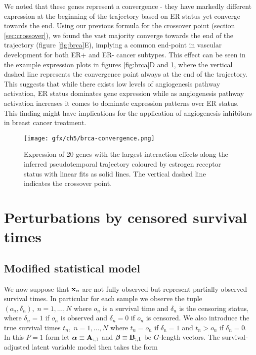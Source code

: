 We noted that these genes represent a convergence - they have markedly different expression at the beginning of the trajectory based on ER status yet converge towards the end. Using our previous formula for the crossover point (section \ref{sec:crossover}), we found the vast majority converge towards the end of the trajectory (figure \ref{fig:brca}E), implying a common end-point in vascular development for both ER+ and ER- cancer subtypes.
This effect can be seen in the example expression plots in figures \ref{fig:brca}D and \ref{fig:brca_convergence}, where the vertical dashed line represents the convergence point always at the end of the trajectory.
This suggests that while there exists low levels of angiogenesis pathway activation, ER status dominates gene expression while as angiogenesis pathway activation increases it comes to dominate expression patterns over ER status. This finding might have implications for the application of angiogenesis inhibitors in breast cancer treatment.

\begin{figure}
   \texttt{[image: gfx/ch5/brca-convergence.png]}
   \caption{Expression of 20 genes with the largest interaction effects along the inferred pseudotemporal trajectory coloured by estrogen receptor status with linear fits as solid lines. The vertical dashed line indicates the crossover point.}
	\label{fig:brca_convergence}
\end{figure}


\section{Perturbations by censored survival times} \label{sec:survival}

\subsection{Modified statistical model}


We now suppose that $\mathbf{x}_n$ are not fully observed but represent partially observed survival times. In particular for each sample we observe the tuple $(o_n, \delta_n), \; n = 1, \ldots, N$ where $o_n$ is a survival time and $\delta_n$ is the censoring status, where $\delta_n = 1$ if $o_n$ is observed and $\delta_n = 0$ if $o_n$ is censored. We also introduce the true survival times $t_n, \; n = 1, \ldots, N$
where $t_n = o_n$ if $\delta_n = 1$ and $t_n > o_n$ if $\delta_n = 0$. In this $P = 1$ form let $\bm{\alpha} \equiv \mathbf{A}_{:,1}$ and $\bm{\beta} \equiv \mathbf{B}_{:,1}$ be $G$-length vectors. The survival-adjusted latent variable model then takes the form

